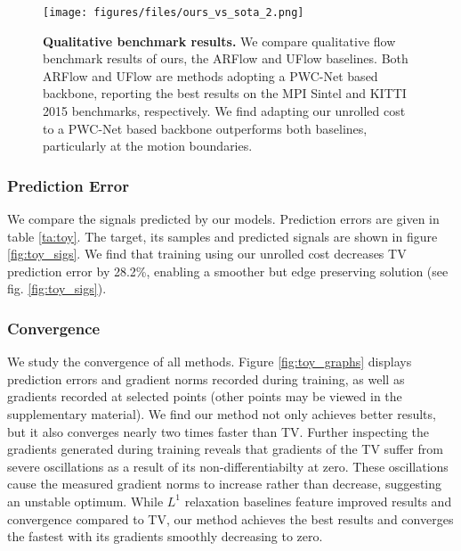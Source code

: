 \documentclass[10pt,twocolumn,letterpaper]{article}
\begin{document}
\begin{figure*}
\begin{center}
\texttt{[image: figures/files/ours\_vs\_sota\_2.png]}
   \caption{\textbf{Qualitative benchmark results.}
   We compare qualitative flow benchmark results of ours, the ARFlow \cite{liu2020learning} and UFlow \cite{jonschkowski2020matters} baselines. Both ARFlow and UFlow are methods adopting a PWC-Net \cite{Sun2018PWC-Net} based backbone, reporting the best results on the MPI Sintel \cite{Butler:ECCV:2012} and KITTI 2015 \cite{Menze2015CVPR} benchmarks, respectively. 
   We find adapting our unrolled cost to a PWC-Net based backbone outperforms both baselines, particularly at the motion boundaries.}
\label{fig:l1vsunroll}
\end{center}
\end{figure*} 
\subsubsection{Prediction Error}
We compare the signals predicted by our models. Prediction errors are given in table \ref{ta:toy}.
The target, its samples and predicted signals are shown in figure \ref{fig:toy_sigs}. We find that training using our unrolled cost decreases TV prediction error by 28.2\%, enabling a smoother but edge preserving solution (see fig. \ref{fig:toy_sigs}).

\subsubsection{Convergence}
We study the convergence of all methods. Figure \ref{fig:toy_graphs} displays prediction errors and gradient norms recorded during training, as well as gradients recorded at selected points (other points may be viewed in the supplementary material). We find our method not only achieves better results, but it also converges nearly two times faster than TV. Further inspecting the gradients generated during training reveals that gradients of the TV suffer from severe oscillations as a result of its non-differentiabilty at zero. These oscillations cause the measured gradient norms to increase rather than decrease, suggesting an unstable optimum. While $L^1$ relaxation baselines feature improved results and convergence compared to TV, our method achieves the best results and converges the fastest with its gradients smoothly decreasing to zero.
\end{document}
